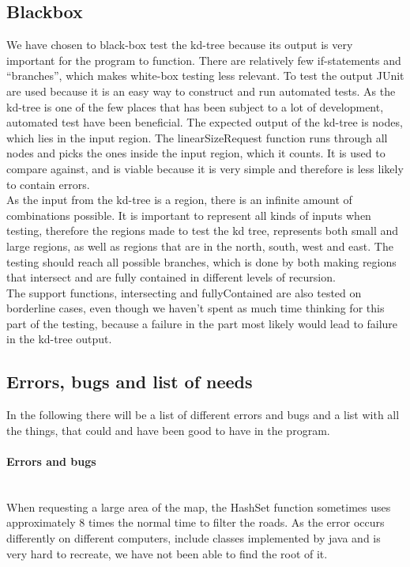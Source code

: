 \documentclass[a4paper,10pt,titlepage]{article}
\begin{document}
		\subsection{Blackbox}
		We have chosen to black-box test the kd-tree because its output is very important for the program to function. There are relatively few if-statements and “branches”, which makes white-box testing less relevant.
To test the output JUnit are used because it is an easy way to construct and run automated tests. As the kd-tree is one of the few places that has been subject to a lot of development, automated test have been beneficial. The expected output of the kd-tree is nodes, which lies in the input region. The linearSizeRequest function runs through all nodes and picks the ones inside the input region, which it counts. It is used to compare against, and is viable because it is very simple and therefore is less likely to contain errors.\\
As the input from the kd-tree is a region, there is an infinite amount of combinations possible. It is important to represent all kinds of inputs when testing, therefore the regions made to test the kd tree, represents both small and large regions, as well as regions that are in the north, south, west and east. The testing should reach all possible branches, which is done by both making regions that intersect and are fully contained in different levels of recursion.\\
The support functions, intersecting and fullyContained are also tested on borderline cases, even though we haven’t spent as much time thinking for this part of the testing, because a failure in the part most likely would lead to failure in the kd-tree output.\\

			
		\subsection{Errors, bugs and list of needs}

		In the following there will be a list of different errors and bugs and a list with all the things, that could and have been good to have in the program.
		\paragraph{Errors and bugs}\mbox{}\\
		
When requesting a large area of the map, the HashSet function sometimes uses approximately 8 times the normal time to filter the roads. As the error occurs differently on different computers, include classes implemented by java and is very hard to recreate, we have not been able to find the root of it.\\
\end{document}
